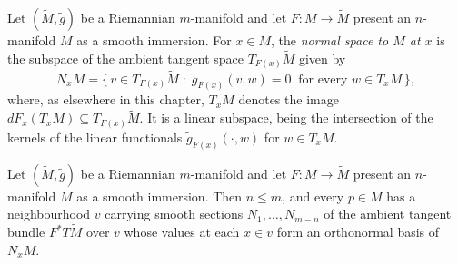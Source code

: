 \begin{definition}
\label{def:normal-space}
\leanok
{}
Let $(\tilde M, \tilde g)$ be a Riemannian $m$-manifold and let $F : M \to \tilde M$ present an
$n$-manifold $M$ as a smooth immersion. For $x \in M$, the \emph{normal space to $M$ at $x$} is
the subspace of the ambient tangent space $T_{F(x)}\tilde M$ given by
\[
  N_x M = \bigl\{\, v \in T_{F(x)}\tilde M \;:\; \tilde g_{F(x)}(v, w) = 0
    \ \text{ for every } w \in T_x M \,\bigr\},
\]
where, as elsewhere in this chapter, $T_x M$ denotes the image $dF_x(T_x M) \subseteq
T_{F(x)}\tilde M$. It is a linear subspace, being the intersection of the kernels of the linear
functionals $\tilde g_{F(x)}(\cdot, w)$ for $w \in T_x M$.
\end{definition}

\begin{lemma}
\label{lem:normal-space-orthonormal-frame}
\leanok
{}
Let $(\tilde M, \tilde g)$ be a Riemannian $m$-manifold and let $F : M \to \tilde M$ present an
$n$-manifold $M$ as a smooth immersion. Then $n \le m$, and every $p \in M$ has a neighbourhood
$v$ carrying smooth sections $N_1, \ldots, N_{m-n}$ of the ambient tangent bundle $F^*T\tilde M$
over $v$ whose values at each $x \in v$ form an orthonormal basis of $N_x M$.
\end{lemma}

